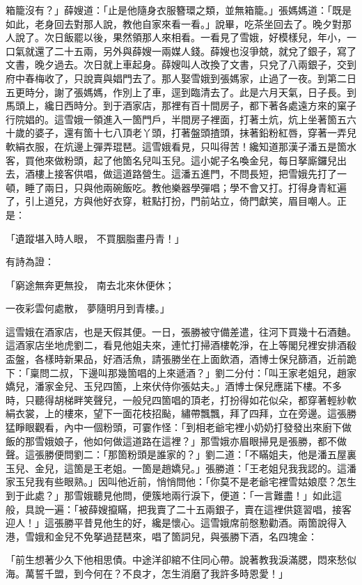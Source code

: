 箱籠沒有？」薛嫂道：「止是他隨身衣服簪環之類，並無箱籠。」張媽媽道：「既是如此，老身回去對那人說，教他自家來看一看。」說畢，吃茶坐回去了。晚夕對那人說了。次日飯罷以後，果然領那人來相看。一看見了雪娥，好模樣兒，年小，一口氣就還了二十五兩，另外與薛嫂一兩媒人錢。薛嫂也沒爭兢，就兌了銀子，寫了文書，晚夕過去。次日就上車起身。薛嫂叫人改換了文書，只兌了八兩銀子，交到府中春梅收了，只說賣與娼門去了。那人娶雪娥到張媽家，止過了一夜。到第二日五更時分，謝了張媽媽，作別上了車，逕到臨清去了。此是六月天氣，日子長。到馬頭上，纔日西時分。到于酒家店，那裡有百十間房子，都下著各處遠方來的窠子行院娼的。這雪娥一領進入一箇門戶，半間房子裡面，打著土炕，炕上坐著箇五六十歲的婆子，還有箇十七八頂老丫頭，打著盤頭揸頭，抹著鉛粉紅唇，穿著一弄兒軟絹衣服，在炕邊上彈弄琨琶。這雪娥看見，只叫得苦！纔知道那漢子潘五是箇水客，買他來做粉頭，起了他箇名兒叫玉兒。這小妮子名喚金兒，每日拏廝鑼兒出去，酒樓上接客供唱，做這道路營生。這潘五進門，不問長短，把雪娥先打了一頓，睡了兩日，只與他兩碗飯吃。教他樂器學彈唱；學不會又打。打得身青紅遍了，引上道兒，方與他好衣穿，粧點打扮，門前站立，倚門獻笑，眉目嘲人。正是：

「遺蹤堪入時人眼，  不買胭脂畫丹青！」

有詩為證：

「窮途無奔更無投，  南去北來休便休；

一夜彩雲何處散，  夢隨明月到青樓。」

這雪娥在酒家店，也是天假其便。一日，張勝被守備差遣，往河下買幾十石酒麯。這酒家店坐地虎劉二，看見他姐夫來，連忙打掃酒樓乾淨，在上等閣兒裡安排酒殽盃盤，各樣時新果品，好酒活魚，請張勝坐在上面飲酒，酒博士保兒篩酒，近前跪下：「稟問二叔，下邊叫那幾箇唱的上來遞酒？」劉二分付：「叫王家老姐兒，趙家嬌兒，潘家金兒、玉兒四箇，上來伏侍你張姑夫。」酒博士保兒應諾下樓。不多時，只聽得胡梯畔笑聲兒，一般兒四箇唱的頂老，打扮得如花似朵，都穿著輕紗軟絹衣裳，上的樓來，望下一面花枝招颭，繡帶飄飄，拜了四拜，立在旁邊。這張勝猛睜眼觀看，內中一個粉頭，可霎作怪：「到相老爺宅裡小奶奶打發發出來廚下做飯的那雪娥娘子，他如何做這道路在這裡？」那雪娥亦眉眼掃見是張勝，都不做聲。這張勝便問劉二：「那箇粉頭是誰家的？」劉二道：「不瞞姐夫，他是潘五屋裏玉兒、金兒，這箇是王老姐。一箇是趙嬌兒。」張勝道：「王老姐兒我我認的。這潘家玉兒我有些眼熟。」因叫他近前，悄悄問他：「你莫不是老爺宅裡雪姑娘麼？怎生到于此處？」那雪娥聽見他問，便簇地兩行淚下，便道：「一言難盡！」如此這般，具說一遍：「被薛嫂攛瞞，把我賣了二十五兩銀子，賣在這裡供筵習唱，接客迎人！」這張勝平昔見他生的好，纔是懷心。這雪娥席前慇懃勸酒。兩箇說得入港，雪娥和金兒不免拏過琵琶來，唱了箇詞兒，與張勝下酒，名四塊金：

「前生想著少久下他相思債。中途洋卻綰不住同心帶。說著教我淚滿腮，悶來愁似海。萬誓千盟，到今何在？不良才，怎生消磨了我許多時恩愛！」


